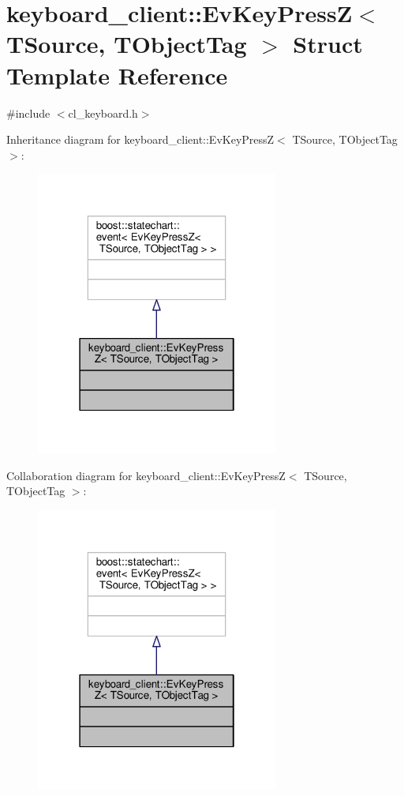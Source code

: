 \hypertarget{structkeyboard__client_1_1EvKeyPressZ}{}\section{keyboard\+\_\+client\+:\+:Ev\+Key\+PressZ$<$ T\+Source, T\+Object\+Tag $>$ Struct Template Reference}
\label{structkeyboard__client_1_1EvKeyPressZ}


{\ttfamily \#include $<$cl\+\_\+keyboard.\+h$>$}



Inheritance diagram for keyboard\+\_\+client\+:\+:Ev\+Key\+PressZ$<$ T\+Source, T\+Object\+Tag $>$\+:\nopagebreak
\begin{figure}[H]
\begin{center}
\leavevmode
\includegraphics[width=226pt]{structkeyboard__client_1_1EvKeyPressZ__inherit__graph}
\end{center}
\end{figure}


Collaboration diagram for keyboard\+\_\+client\+:\+:Ev\+Key\+PressZ$<$ T\+Source, T\+Object\+Tag $>$\+:\nopagebreak
\begin{figure}[H]
\begin{center}
\leavevmode
\includegraphics[width=226pt]{structkeyboard__client_1_1EvKeyPressZ__coll__graph}
\end{center}
\end{figure}


